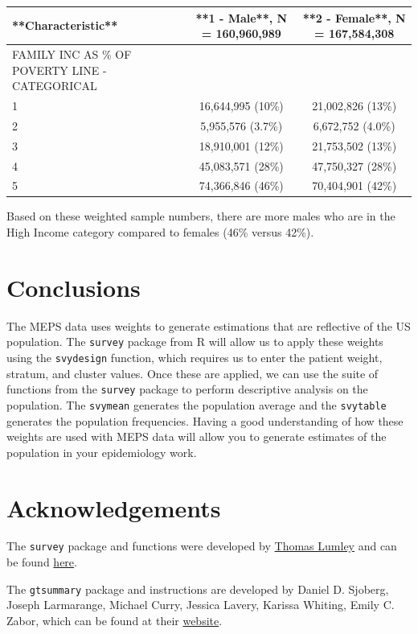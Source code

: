 \documentclass[
]{book}
\theoremstyle{definition}
\theoremstyle{definition}
\theoremstyle{definition}
\theoremstyle{definition}
\theoremstyle{remark}
\begin{document}
\begin{tabular}{l|c|c}
\hline
**Characteristic** & **1 - Male**, N = 160,960,989 & **2 - Female**, N = 167,584,308\\
\hline
FAMILY INC AS \% OF POVERTY LINE - CATEGORICAL &  & \\
\hline
1 & 16,644,995 (10\%) & 21,002,826 (13\%)\\
\hline
2 & 5,955,576 (3.7\%) & 6,672,752 (4.0\%)\\
\hline
3 & 18,910,001 (12\%) & 21,753,502 (13\%)\\
\hline
4 & 45,083,571 (28\%) & 47,750,327 (28\%)\\
\hline
5 & 74,366,846 (46\%) & 70,404,901 (42\%)\\
\hline
\end{tabular}

Based on these weighted sample numbers, there are more males who are in the High Income category compared to females (46\% versus 42\%).

\hypertarget{conclusions-2}{%
\section{Conclusions}\label{conclusions-2}}

The MEPS data uses weights to generate estimations that are reflective of the US population. The \texttt{survey} package from R will allow us to apply these weights using the \texttt{svydesign} function, which requires us to enter the patient weight, stratum, and cluster values. Once these are applied, we can use the suite of functions from the \texttt{survey} package to perform descriptive analysis on the population. The \texttt{svymean} generates the population average and the \texttt{svytable} generates the population frequencies. Having a good understanding of how these weights are used with MEPS data will allow you to generate estimates of the population in your epidemiology work.

\hypertarget{acknowledgements-2}{%
\section{Acknowledgements}\label{acknowledgements-2}}

The \texttt{survey} package and functions were developed by \href{https://profiles.auckland.ac.nz/t-lumley}{Thomas Lumley} and can be found \href{https://www.rdocumentation.org/packages/survey/versions/4.1-1}{here}.

The \texttt{gtsummary} package and instructions are developed by Daniel D. Sjoberg, Joseph Larmarange, Michael Curry, Jessica Lavery, Karissa Whiting, Emily C. Zabor, which can be found at their \href{https://www.danieldsjoberg.com/gtsummary/reference/tbl_svysummary.html}{website}.
\end{document}
